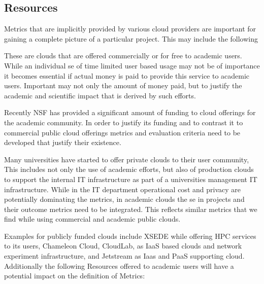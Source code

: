 \documentclass{sig-alternate-05-2015}
\begin{document}
\subsection{Resources}

Metrics that are implicitly provided by various cloud providers are
important for gaining a complete picture of a particular project. This
may include the following

\begin{description}
\setlength\itemsep{-2pt}

\item[\it Commercial public clouds.] These are clouds that are offered
  commercially or for free to academic users. While an individual se
  of time limited user based usage may not be of importance it becomes
  essential if actual money is paid to provide this service to
  academic users. Important may not only the amount of money paid, but
  to justify the academic and scientific impact
  \cite{las2015cluster,las2015xsede} that is derived by such efforts.

\item[\it Academic public clouds.] Recently NSF has provided a significant
  amount of funding to cloud offerings for the academic community. In
  order to justify its funding and to contrast it to commercial public
  cloud offerings metrics and evaluation criteria need to be
  developed that justify their existence. 

\item[\it Academic private clouds.] Many universities have started to
  offer private clouds to their user community, This includes not only
  the use of academic efforts, but also of production clouds to support
  the internal IT infrastructure as part of a universities management
  IT infrastructure. While in the IT department operational cost and
  privacy are potentially dominating the metrics, in academic clouds
  the se in projects and their outcome metrics need to be
  integrated. This reflects similar metrics that we find while using
  commercial and academic public clouds.

\end{description}

Examples for publicly funded clouds include XSEDE while offering HPC
services to its users, Chameleon Cloud, CloudLab, as IaaS based clouds
and network experiment infrastructure, and Jetstream as Iaas and PaaS
supporting cloud. Additionally the following Resources offered to
academic users will have a potential impact on the definition of Metrics:
\end{document}
